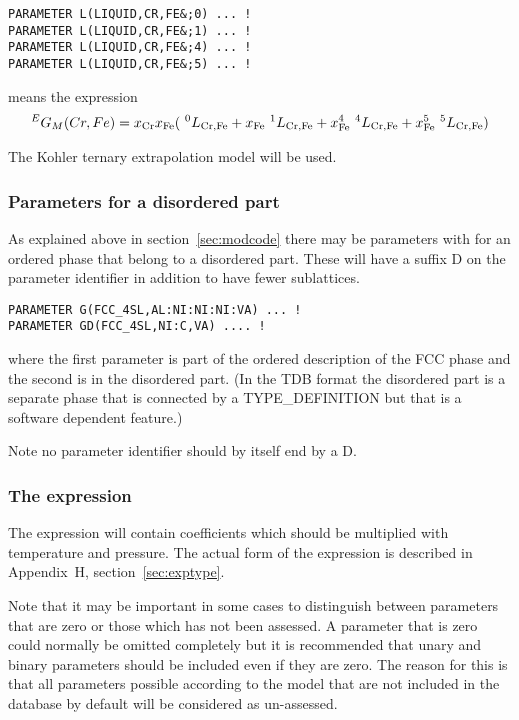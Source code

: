 \documentclass[12pt]{article}
\begin{document}
\begin{verbatim}
PARAMETER L(LIQUID,CR,FE&;0) ... !
PARAMETER L(LIQUID,CR,FE&;1) ... !
PARAMETER L(LIQUID,CR,FE&;4) ... !
PARAMETER L(LIQUID,CR,FE&;5) ... !
\end{verbatim}

means the expression
\begin{eqnarray}
^EG_M(Cr,Fe) = x_{\rm Cr}x_{\rm Fe}(~^0L_{\rm Cr,Fe}+x_{\rm Fe}~^1L_{\rm Cr,Fe}+x_{\rm Fe}^4~^4L_{\rm Cr,Fe}+x_{\rm Fe}^5~^5L_{\rm Cr,Fe})
\end{eqnarray}

The Kohler ternary extrapolation model will be used.

\subsubsection{Parameters for a disordered part}\label{sec:suffixd}

As explained above in section~\ref{sec:modcode} there may be parameters
with for an ordered phase that belong to a disordered part.  These
will have a suffix D on the parameter identifier in addition to have
fewer sublattices.

\begin{verbatim}
PARAMETER G(FCC_4SL,AL:NI:NI:NI:VA) ... !
PARAMETER GD(FCC_4SL,NI:C,VA) .... !
\end{verbatim}
where the first parameter is part of the ordered description of the
FCC phase and the second is in the disordered part.  (In the TDB
format the disordered part is a separate phase that is connected by a
TYPE\_DEFINITION but that is a software dependent feature.)

Note no parameter identifier should by itself end by a D.

\subsubsection{The expression}

The expression will contain coefficients which should be multiplied
with temperature and pressure.  The actual form of the expression is
described in Appendix~H, section~\ref{sec:exptype}.

Note that it may be important in some cases to distinguish between
parameters that are zero or those which has not been assessed.  A
parameter that is zero could normally be omitted completely but it is
recommended that unary and binary parameters should be included even
if they are zero.  The reason for this is that all parameters possible
according to the model that are not included in the database by
default will be considered as un-assessed.
\end{document}
